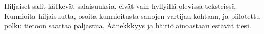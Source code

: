 \documentclass{article}
\begin{document}
\begin{infobox}
Hiljaiset salit kätkevät salaisuuksia, eivät vain hyllyillä olevissa teksteissä. Kunnioita hiljaisuutta, osoita kunnioitusta sanojen vartijaa kohtaan, ja piilotettu polku tietoon saattaa paljastua. Äänekkkyys ja häiriö ainoastaan estävät tiesi.
\end{infobox}
\end{document}

